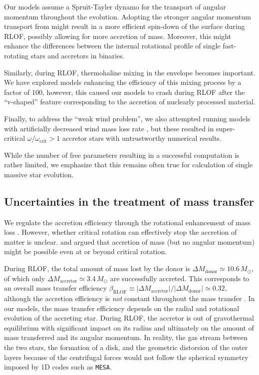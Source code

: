 \documentclass[twocolumn,twocolappendix,trackchanges]{aastex63}
\begin{document}
Our models assume a Spruit-Tayler dynamo \citep{spruit:02} for the
transport of angular momentum throughout the evolution. Adopting the
stronger angular momentum transport from \cite{fuller:19} might result
in a more efficient spin-down of the surface during RLOF, possibly
allowing for more accretion of mass. Moreover, this might enhance the
differences between the internal rotational profile of single
fast-rotating stars and accretors in binaries.

Similarly, during RLOF, thermohaline mixing in the envelope becomes
important. We have explored models enhancing the efficiency of this
mixing process by a factor of 100, however, this caused our models to
crash during RLOF after the ``v-shaped'' feature corresponding to the
accretion of nuclearly processed material.

Finally, to address the ``weak wind problem'', we also attempted
running models with artificially decreased wind mass loss rate
\citep[e.g.,][]{renzo:17}, but these resulted in super-critical
$\omega/\omega_\mathrm{crit}>1$ accretor stars with untrustworthy
numerical results.

While the number of free parameters resulting in a successful
computation is rather limited, we emphasize that this remains often
true for calculation of single massive star evolution.

\subsection{Uncertainties in the treatment of mass transfer}
\label{sec:bin_param}

We regulate the accretion efficiency through the rotational
enhancement of mass loss \citep[e.g.,][]{langer:98}.
However, whether critical rotation can effectively stop the accretion
of matter is unclear. \cite{popham:91} and \cite{paczynski:91}
argued that accretion of mass (but no angular momentum) might be
possible even at or beyond critical rotation.

During RLOF, the total amount of mass lost by the donor is
$\Delta M_\mathrm{donor} \simeq 10.6\,M_\odot$, of which only
$\Delta M_\mathrm{accretor}\simeq 3.4\,M_\odot$ are successfully
accreted. This corresponds to an overall mass transfer efficiency
$\beta_\mathrm{RLOF}\equiv |\Delta M_\mathrm{accretor}|/|\Delta M_\mathrm{donor}| \simeq 0.32$,
although the accretion efficiency is \emph{not} constant throughout
the mass transfer \citep[e.g.,][]{vanrensbergen:06}. In our models,
the mass transfer efficiency depends on the radial and rotational
evolution of the accreting star. During RLOF, the accretor is out of
gravothermal equilibrium with significant impact on its radius and
ultimately on the amount of mass transferred and its angular
momentum. In reality, the gas stream between the two stars, the
formation of a disk, and the geometric distorsion of the outer layers because
of the centrifugal forces would not follow the spherical symmetry
imposed by 1D codes such as \texttt{MESA}.
\end{document}
